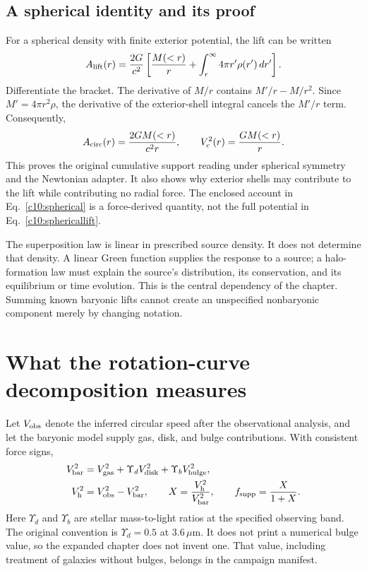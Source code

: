 \subsection{A spherical identity and its proof}

For a spherical density with finite exterior potential, the lift can be written
\begin{equation}
 A_{\rm lift}(r)=\frac{2G}{c^2}\left[
 \frac{M(<r)}{r}+\int_r^\infty4\pi r'\rho(r')\,dr'\right].
 \label{c10:sphericallift}
\end{equation}
Differentiate the bracket. The derivative of $M/r$ contains $M'/r-M/r^2$. Since $M'=4\pi r^2\rho$, the derivative of the exterior-shell integral cancels the $M'/r$ term. Consequently,
\begin{equation}
 A_{\rm circ}(r)=\frac{2GM(<r)}{c^2r},\qquad
 V_c^2(r)=\frac{GM(<r)}{r}.
 \label{c10:spherical}
\end{equation}
This proves the original cumulative support reading under spherical symmetry and the Newtonian adapter. It also shows why exterior shells may contribute to the lift while contributing no radial force. The enclosed account in Eq.~\eqref{c10:spherical} is a force-derived quantity, not the full potential in Eq.~\eqref{c10:sphericallift}.

The superposition law is linear in prescribed source density. It does not determine that density. A linear Green function supplies the response to a source; a halo-formation law must explain the source's distribution, its conservation, and its equilibrium or time evolution. This is the central dependency of the chapter. Summing known baryonic lifts cannot create an unspecified nonbaryonic component merely by changing notation.

\section{What the rotation-curve decomposition measures}

Let $V_{\rm obs}$ denote the inferred circular speed after the observational analysis, and let the baryonic model supply gas, disk, and bulge contributions. With consistent force signs,
\begin{align}
 V_{\rm bar}^2&=V_{\rm gas}^2+\Upsilon_dV_{\rm disk}^2
 +\Upsilon_bV_{\rm bulge}^2,\label{c10:baryons}\\
 V_{\rm h}^2&=V_{\rm obs}^2-V_{\rm bar}^2,\qquad
 X=\frac{V_{\rm h}^2}{V_{\rm bar}^2},\qquad
 f_{\rm supp}=\frac{X}{1+X}.
 \label{c10:x}
\end{align}
Here $\Upsilon_d$ and $\Upsilon_b$ are stellar mass-to-light ratios at the specified observing band. The original convention is $\Upsilon_d=0.5$ at $3.6\,\mu\mathrm m$. It does not print a numerical bulge value, so the expanded chapter does not invent one. That value, including treatment of galaxies without bulges, belongs in the campaign manifest.

